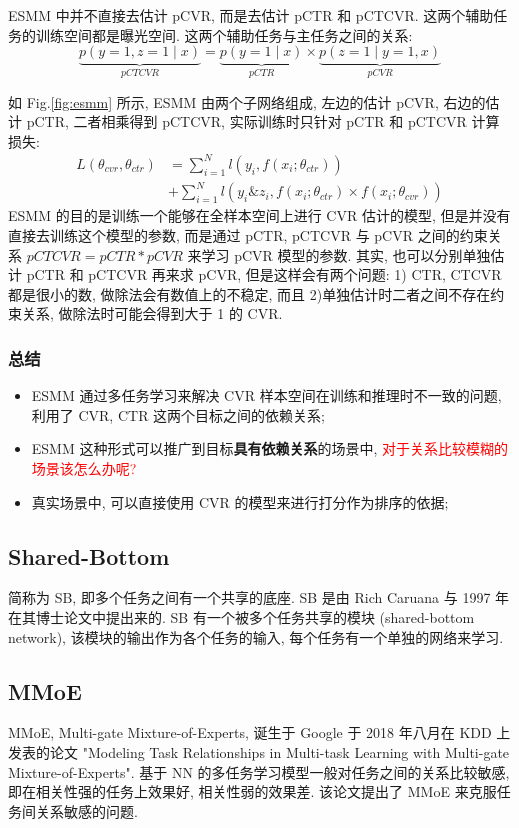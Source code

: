ESMM 中并不直接去估计 pCVR, 而是去估计 pCTR 和 pCTCVR. 这两个辅助任务的训练空间都是曝光空间. 这两个辅助任务与主任务之间的关系:
$$
\underbrace{p(y=1, z=1 \mid x)}_{p C T C V R}=\underbrace{p(y=1 \mid x)}_{p C T R} \times \underbrace{p(z=1 \mid y=1, x)}_{p C V R}
$$

如 Fig.\ref{fig:esmm} 所示, ESMM 由两个子网络组成, 左边的估计 pCVR, 右边的估计 pCTR, 二者相乘得到 pCTCVR, 实际训练时只针对 pCTR 和 pCTCVR 计算损失:
$$
\begin{aligned}
	L\left(\theta_{c v r}, \theta_{c t r}\right) &=\sum_{i=1}^{N} l\left(y_{i}, f\left(x_{i} ; \theta_{c t r}\right)\right) \\
	&+\sum_{i=1}^{N} l\left(y_{i} \& z_{i}, f\left(x_{i} ; \theta_{c t r}\right) \times f\left(x_{i} ; \theta_{c v r}\right)\right)
\end{aligned}
$$
ESMM 的目的是训练一个能够在全样本空间上进行 CVR 估计的模型, 但是并没有直接去训练这个模型的参数, 而是通过 pCTR, pCTCVR 与 pCVR 之间的约束关系 $pCTCVR = pCTR * pCVR$ 来学习 pCVR 模型的参数. 其实, 也可以分别单独估计 pCTR 和 pCTCVR 再来求 pCVR, 但是这样会有两个问题: 1) CTR, CTCVR 都是很小的数, 做除法会有数值上的不稳定, 而且 2)单独估计时二者之间不存在约束关系, 做除法时可能会得到大于 1 的 CVR.

\subsubsection{总结}
\begin{itemize}
	\item ESMM 通过多任务学习来解决 CVR 样本空间在训练和推理时不一致的问题, 利用了 CVR, CTR 这两个目标之间的依赖关系;
	
	\item ESMM 这种形式可以推广到目标\textbf{具有依赖关系}的场景中, \textcolor{red}{对于关系比较模糊的场景该怎么办呢?}
	
	\item 真实场景中, 可以直接使用 CVR 的模型来进行打分作为排序的依据;
\end{itemize}

\subsection{Shared-Bottom}
简称为 SB, 即多个任务之间有一个共享的底座. SB 是由 Rich Caruana 与 1997 年在其博士论文中提出来的. SB 有一个被多个任务共享的模块 (shared-bottom network), 该模块的输出作为各个任务的输入, 每个任务有一个单独的网络来学习.

\subsection{MMoE}
MMoE, Multi-gate Mixture-of-Experts, 诞生于 Google 于 2018 年八月在 KDD 上发表的论文 "Modeling Task Relationships in Multi-task Learning with Multi-gate Mixture-of-Experts". 基于 NN 的多任务学习模型一般对任务之间的关系比较敏感, 即在相关性强的任务上效果好, 相关性弱的效果差. 该论文提出了 MMoE 来克服任务间关系敏感的问题.

